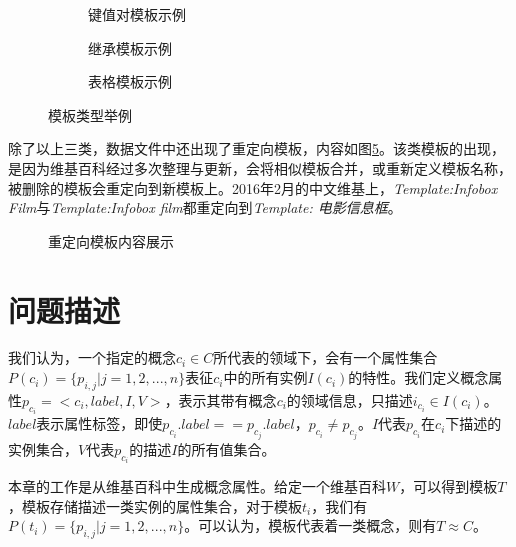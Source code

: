 \begin{figure}[ht]
\centering
    \begin{subfigure}{7.2cm}
        \centering
        \caption{键值对模板示例}
        \label{fig:template-keyvalue}
    \end{subfigure}%
    \hspace{0.01cm}%
    \begin{subfigure}{7.2cm}
        \centering
        \caption{继承模板示例}
        \label{fig:template-inherit}
    \end{subfigure}
    \vspace{0.01cm}%
    \begin{subfigure}{9.6cm}
        \centering
        \caption{表格模板示例}
        \label{fig:template-table}
    \end{subfigure}%
\caption{模板类型举例}
\label{fig:template-examples}
\end{figure}

除了以上三类，数据文件中还出现了{\heiti 重定向模板}，内容如图\ref{fig:template-redirect}。该类模板的出现，是因为维基百科经过多次整理与更新，会将相似模板合并，或重新定义模板名称，被删除的模板会重定向到新模板上。2016年2月的中文维基上，\textit{Template:Infobox Film}与\textit{Template:Infobox film}都重定向到\textit{Template: 电影信息框}。

\begin{figure}[H]
  \centering
  \caption{重定向模板内容展示}
  \label{fig:template-redirect}
\end{figure}

\section{问题描述}

我们认为，一个指定的概念$c_i \in C$所代表的领域下，会有一个属性集合$P(c_i)=\{p_{i,j}|j=1,2,...,n\}$表征$c_i$中的所有实例$I(c_i)$的特性。我们定义概念属性$p_{c_i}= <c_i, label, I, V>$，表示其带有概念$c_i$的领域信息，只描述$i_{c_i} \in I(c_i)$。$label$表示属性标签，即使$p_{c_i}.label == p_{c_j}.label$，$p_{c_i} \neq p_{c_j}$。$I$代表$p_{c_i}$在$c_i$下描述的实例集合，$V$代表$p_{c_i}$的描述$I$的所有值集合。

本章的工作是从维基百科中生成概念属性。给定一个维基百科$W$，可以得到模板$T$，模板存储描述一类实例的属性集合，对于模板$t_i$，我们有$P(t_i)=\{p_{i,j}|j=1,2,...,n\}$。可以认为，模板代表着一类概念，则有$T \approx C$。

